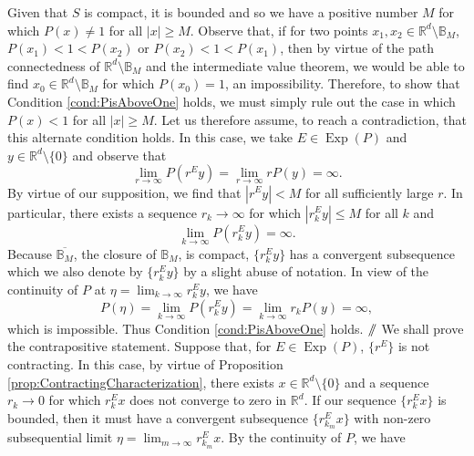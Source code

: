\documentclass[smallextended]{svjour3}
\theoremstyle{remark}
\renewcommand*{\qedsymbol}{\hfill$\mathbin{/\mkern-6mu/}$}
\renewenvironment{subproof}[1][\proofname]{\renewcommand\xsubproofname{#1}\xsubproof}{\endxsubproof}
\renewenvironment{proof}[1][\proofname]{\renewcommand\xproofname{#1}\xproof}{\endxproof}
\newcommand\Exp{\operatorname{Exp}}
\begin{document}
\begin{proof}[Proof of Proposition \ref{prop:PositiveHomogeneousCharacterization}]
\begin{subproof}[$\ref{cond:SisCompact}\Rightarrow\ref{cond:PisAboveOne}$]
Given that $S$ is compact, it is bounded and so we have a positive number $M$ for which $P(x)\neq 1$ for all $|x|\geq M$. Observe that, if for two points $x_1,x_2\in \mathbb{R}^d\setminus\mathbb{B}_M$, $P(x_1)<1<P(x_2)$ or $P(x_2)<1<P(x_1)$, then by virtue of the path connectedness of $\mathbb{R}^d\setminus\mathbb{B}_M$ and the intermediate value theorem, we would be able to find  $x_0\in\mathbb{R}^d\setminus\mathbb{B}_M$ for which $P(x_0)=1$, an impossibility. Therefore, to show that Condition \ref{cond:PisAboveOne} holds, we must simply rule out the case in which $P(x)<1$ for all $|x|\geq M$. Let us therefore assume, to reach a contradiction, that this alternate condition holds. In this case, we take $E\in\Exp(P)$ and $y\in\mathbb{R}^d\setminus \{0\}$ and observe that
\begin{equation*}
\lim_{r\to\infty}P(r^Ey)=\lim_{r\to\infty}rP(y)=\infty.
\end{equation*}
By virtue of our supposition, we find that $|r^Ey|<M$ for all sufficiently large $r$. In particular, there exists a sequence $r_k\to\infty$ for which $|r_k^Ey|\leq M$ for all $k$ and 
\begin{equation*}
\lim_{k\to\infty}P(r_k^Ey)=\infty.
\end{equation*}
Because $\overline{\mathbb{B}_M}$, the closure of $\mathbb{B}_M$, is compact, $\{r_k^Ey\}$ has a convergent subsequence which we also denote by $\{r_k^Ey\}$ by a slight abuse of notation. In view of the continuity of $P$ at $\eta=\lim_{k\to\infty}r_k^Ey$, we have
\begin{equation*}
P(\eta)=\lim_{k\to\infty}P(r_k^Ey)=\lim_{k\to\infty}r_kP(y)=\infty,
\end{equation*}
which is impossible. Thus Condition \ref{cond:PisAboveOne} holds.
\qedsymbol
\end{subproof}
\begin{subproof}[$\ref{cond:PisAboveOne}\Rightarrow\ref{cond:Contracting}$]
We shall prove the contrapositive statement. Suppose that, for $E\in\Exp(P)$, $\{r^E\}$ is not contracting. In this case, by virtue of Proposition \ref{prop:ContractingCharacterization}, there exists $x\in\mathbb{R}^d\setminus\{0\}$ and a sequence $r_k\to 0$ for which $r_k^Ex$ does not converge to zero in $\mathbb{R}^d$. If our sequence $\{r_k^Ex\}$ is bounded, then it must have a convergent subsequence $\{r_{k_m}^Ex\}$ with non-zero subsequential limit $\eta=\lim_{m\to\infty}r_{k_m}^Ex$. By the continuity of $P$, we have

\end{subproof}
\end{proof}
\end{document}
